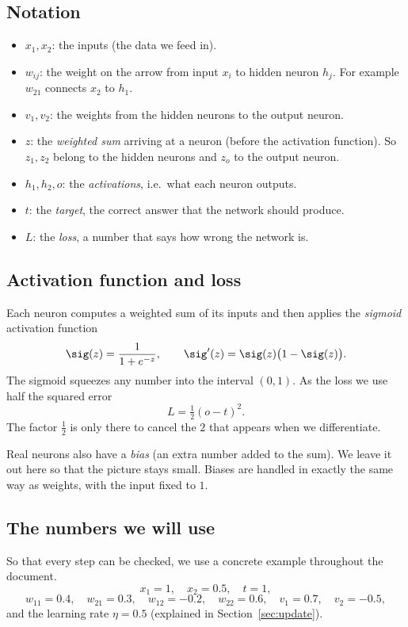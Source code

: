 \subsection*{Notation}
\begin{itemize}
  \item $x_1,x_2$: the inputs (the data we feed in).
  \item $w_{ij}$: the weight on the arrow from input $x_i$ to hidden neuron $h_j$. For example $w_{21}$ connects $x_2$ to $h_1$.
  \item $v_1,v_2$: the weights from the hidden neurons to the output neuron.
  \item $z$: the \emph{weighted sum} arriving at a neuron (before the activation function). So $z_1,z_2$ belong to the hidden neurons and $z_o$ to the output neuron.
  \item $h_1,h_2,o$: the \emph{activations}, i.e.\ what each neuron outputs.
  \item $t$: the \emph{target}, the correct answer that the network should produce.
  \item $L$: the \emph{loss}, a number that says how wrong the network is.
\end{itemize}

\subsection*{Activation function and loss}
Each neuron computes a weighted sum of its inputs and then applies the \emph{sigmoid} activation function
\[
\sig(z)=\frac{1}{1+e^{-z}},
\qquad
\sig'(z)=\sig(z)\bigl(1-\sig(z)\bigr).
\]
The sigmoid squeezes any number into the interval $(0,1)$. As the loss we use half the squared error
\[
L=\tfrac12(o-t)^2.
\]
The factor $\tfrac12$ is only there to cancel the $2$ that appears when we differentiate.

\begin{keyidea}[Simplification]
Real neurons also have a \emph{bias} (an extra number added to the sum). We leave it out here so that the picture stays small. Biases are handled in exactly the same way as weights, with the input fixed to $1$.
\end{keyidea}

\subsection*{The numbers we will use}
So that every step can be checked, we use a concrete example throughout the document.
\[
x_1=1,\quad x_2=0.5,\quad t=1,
\]
\[
w_{11}=0.4,\quad w_{21}=0.3,\quad w_{12}=-0.2,\quad w_{22}=0.6,\quad v_1=0.7,\quad v_2=-0.5,
\]
and the learning rate $\eta=0.5$ (explained in Section~\ref{sec:update}).

